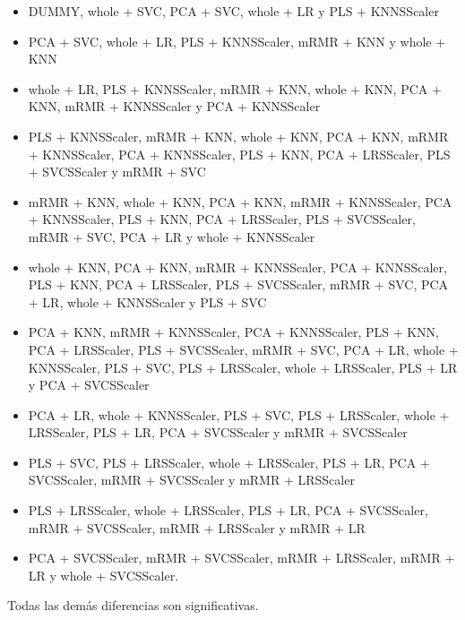 \documentclass[a4paper,oneside,11pt,leqno]{article}
\begin{document}
	\begin{itemize}
		\item DUMMY, whole + SVC, PCA + SVC, whole + LR y PLS + KNNSScaler
		
		\item PCA + SVC, whole + LR, PLS + KNNSScaler, mRMR + KNN y whole + KNN
		
		\item whole + LR, PLS + KNNSScaler, mRMR + KNN, whole + KNN, PCA + KNN, mRMR + KNNSScaler y PCA + KNNSScaler
		
		\item PLS + KNNSScaler, mRMR + KNN, whole + KNN, PCA + KNN, mRMR + KNNSScaler, PCA + KNNSScaler, PLS + KNN, PCA + LRSScaler, PLS + SVCSScaler y mRMR + SVC

		\item mRMR + KNN, whole + KNN, PCA + KNN, mRMR + KNNSScaler, PCA + KNNSScaler, PLS + KNN, PCA + LRSScaler, PLS + SVCSScaler, mRMR + SVC, PCA + LR y whole + KNNSScaler
		
		\item whole + KNN, PCA + KNN, mRMR + KNNSScaler, PCA + KNNSScaler, PLS + KNN, PCA + LRSScaler, PLS + SVCSScaler, mRMR + SVC, PCA + LR, whole + KNNSScaler y PLS + SVC
		
		\item PCA + KNN, mRMR + KNNSScaler, PCA + KNNSScaler, PLS + KNN, PCA + LRSScaler, PLS + SVCSScaler, mRMR + SVC, PCA + LR, whole + KNNSScaler, PLS + SVC, PLS + LRSScaler, whole + LRSScaler, PLS + LR y PCA + SVCSScaler
		
		\item PCA + LR, whole + KNNSScaler, PLS + SVC, PLS + LRSScaler, whole + LRSScaler, PLS + LR, PCA + SVCSScaler y mRMR + SVCSScaler
		
		\item PLS + SVC, PLS + LRSScaler, whole + LRSScaler, PLS + LR, PCA + SVCSScaler, mRMR + SVCSScaler y mRMR + LRSScaler
		
		\item PLS + LRSScaler, whole + LRSScaler, PLS + LR, PCA + SVCSScaler, mRMR + SVCSScaler, mRMR + LRSScaler y mRMR + LR
		
		\item PCA + SVCSScaler, mRMR + SVCSScaler, mRMR + LRSScaler, mRMR + LR y whole + SVCSScaler. 
		
	\end{itemize}
	
	Todas las demás diferencias son significativas.
	
\end{document}
